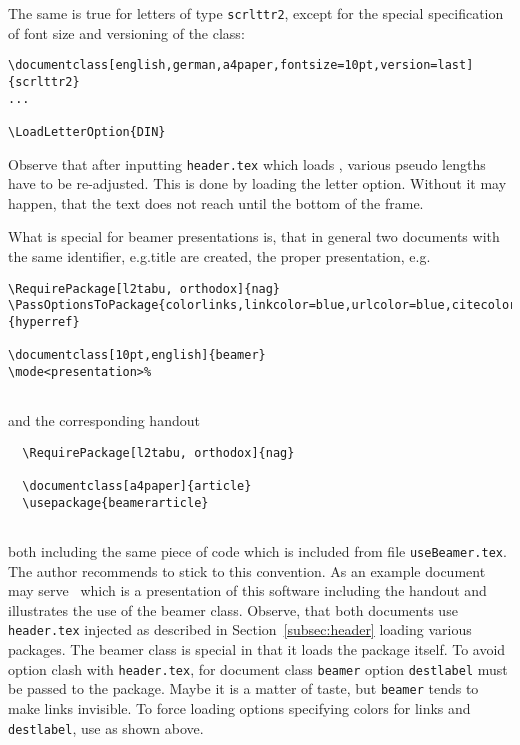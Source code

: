 The same is true for letters of type \texttt{scrlttr2}, 
except for the special specification of font size and versioning of the class: 

\begin{Verbatim}[fontsize=\footnotesize]
\documentclass[english,german,a4paper,fontsize=10pt,version=last]{scrlttr2}
...

\LoadLetterOption{DIN}
\end{Verbatim}

Observe that after inputting \texttt{header.tex} which loads , 
various pseudo lengths have to be re-adjusted. 
This is done by loading the letter option. 
Without it may happen, that the text does not reach until the bottom of the frame. 


What is special for beamer presentations is, 
that in general two documents with the same identifier, e.g.\@ title are created, 
the proper presentation, e.g.\@ 
\begin{Verbatim}[fontsize=\scriptsize]
\RequirePackage[l2tabu, orthodox]{nag}
\PassOptionsToPackage{colorlinks,linkcolor=blue,urlcolor=blue,citecolor=blue,destlabel}{hyperref}

\documentclass[10pt,english]{beamer}
\mode<presentation>%


\end{Verbatim}
%
and the corresponding handout 
%
\begin{Verbatim}
  \RequirePackage[l2tabu, orthodox]{nag}

  \documentclass[a4paper]{article}
  \usepackage{beamerarticle}
  
\end{Verbatim}
%
both including the same piece of code which is included from file \texttt{useBeamer.tex}. 
The author recommends to stick to this convention. 
As an example document may serve~\cite{PresBeamer} 
which is a presentation of this software including the handout 
and illustrates the use of the beamer class. 
Observe, that both documents use \texttt{header.tex} injected 
as described in Section~\ref{subsec:header} loading various packages. 
The beamer class is special in that it loads the  package itself. 
To avoid option clash with \texttt{header.tex}, 
for document class \texttt{beamer} option \texttt{destlabel} 
must be passed to the package. 
Maybe it is a matter of taste, but \texttt{beamer} tends to make links invisible. 
To force loading options specifying colors for links and \texttt{destlabel}, 
use  as shown above. 

